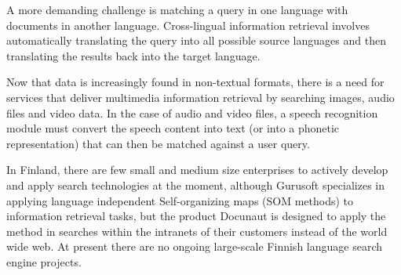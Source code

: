 \documentclass{../../metanetpaper}
\begin{document}
\begin{Parallel}[c]{79mm}{78mm}
{A more demanding challenge is matching a query in one language with
documents in another language. Cross-lingual information retrieval
involves automatically translating the query into all possible source
languages and then translating the results back into the target
language.

Now that data is increasingly found in non-textual formats, there is a
need for services that deliver multimedia information retrieval by
searching images, audio files and video data. In the case of audio and
video files, a speech recognition module must convert the speech
content into text (or into a phonetic representation) that can then be
matched against a user query.

In Finland, there are few small and medium size enterprises to actively develop and apply search
technologies at the moment, although Gurusoft specializes in applying
language independent Self-organizing maps (SOM methods) to information
retrieval tasks, but the product Docunaut is designed to apply the method in searches within the intranets of their customers instead of the world wide web. At present
there are no ongoing large-scale Finnish language search engine
projects.



}

\ParallelPar


\end{Parallel}
\end{document}
